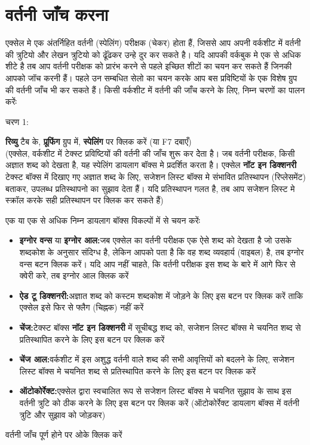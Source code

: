 \section{वर्तनी जाँच करना}\label{id-1.39}

एक्सेल मे एक अंतर्निहित वर्तनी (स्पेलिंग) परीक्षक (चेकर) होता हैं, जिससे आप अपनी वर्कशीट में वर्तनी की त्रुटियो और लेखन त्रुटियो को ढूॅंढकर उन्हे दुर कर सकते है। यदि आपकी वर्कबुक मे एक से अधिक शीटे है तब आप वर्तनी परीक्षक को प्रारंभ करने से पहले इच्छित शीटों का चयन कर सकते हैं जिनकी आपको जॉच करनी हैं। पहले उन सम्बधित सेलो का चयन करके आप बस प्रविष्टियों के एक विशेष ग्रुप की वर्तनी जाँच भी कर सकते हैं। किसी वर्कशीट में वर्तनी की जाँच करने के लिए, निम्न चरणों का पालन करेंः

\begin{descriptionSimple}{चरण 1:}
\item[चरण 1] \textbf{रिव्यु} टैब के, \textbf{प्रूफिंग} ग्रुप में, \textbf{स्पेलिंग} पर क्लिक करें (या  {\eng F7}  दबाएँ)\\  (एक्सेल, वर्कशीट में टेक्स्ट प्रविष्टियों की वर्तनी की जाँच शुरू कर देेता है। जब वर्तनी परीक्षक, किसी अज्ञात शब्द को देखता है, यह स्पेलिंग डायलाग बॉक्स मे प्रदर्शित करता है। एक्सेल \textbf{नॉट इन डिक्शनरी} टेक्स्ट बॉक्स में दिखाए गए अज्ञात शब्द के लिए, सजेशन लिस्ट बॉक्स मे संभावित प्रतिस्थापन (रिप्लेसमेंट) बताकर, उपलब्ध प्रतिस्थापनो का सुझाव देता हैं। यदि प्रतिस्थापन गलत है, तब आप सजेशन लिस्ट मे स्क्रॉल करके सही प्रतिस्थापन पर क्लिक कर सकते हैं)
\item[चरण 2] एक या एक से अधिक निम्न डायलाग बॉक्स विकल्पों में से चयन करेंः
		\begin{itemize}
		\item \textbf{इग्नोर वन्स} या \textbf{इग्नोर आल:}जब एक्सेल का वर्तनी परीक्षक एक ऐसे शब्द को देखता है जो उसके शब्दकोश के अनुसार संदिग्ध है, लेकिन आपको पता है कि वह शब्द व्यवहार्य (वाइबल) है, तब इग्नोर वन्स बटन क्लिक करें। यदि आप नहीं चाहते, कि वर्तनी परीक्षक इस शब्द के बारे में आगे फिर से क्वेरी करे, तब इग्नोर आल क्लिक करें
		\item \textbf{ऐड टू डिक्शनरी:}अज्ञात शब्द को कस्टम शब्दकोश में जोड़ने के लिए इस बटन पर क्लिक करें ताकि एक्सेल इसे फिर से फ्लैग (चिह्नक) नहीं करें
		\item \textbf{चेंज:}टेक्स्ट बॉक्स \textbf{नॉट इन डिक्शनरी} में सूचीबद्ध शब्द को, सजेशन लिस्ट बॉक्स मे चयनित शब्द से प्रतिस्थापित करने के लिए इस बटन पर क्लिक करें
		\item \textbf{चेंज आल:}वर्कशीट में इस अशुद्ध वर्तनी वाले शब्द की सभी आवृत्तियों को बदलने के लिए, सजेशन लिस्ट बॉक्स मे चयनित शब्द से प्रतिस्थापित करने के लिए इस बटन पर क्लिक करें
		\item \textbf{ऑटोकोर्रेक्ट:}एक्सेल द्वारा स्वचालित रूप से सजेशन लिस्ट बॉक्स मे चयनित सुझाव के साथ इस वर्तनी त्रुटि को ठीक करने के लिए इस बटन पर क्लिक करें (ऑटोकोर्रेक्ट डायलाग बॉक्स में वर्तनी त्रुटि और सुझाव को जोड़कर)
		\end{itemize}
\item[चरण 3] वर्तनी जाँच पूर्ण होने पर ओके क्लिक करें
\end{descriptionSimple}
